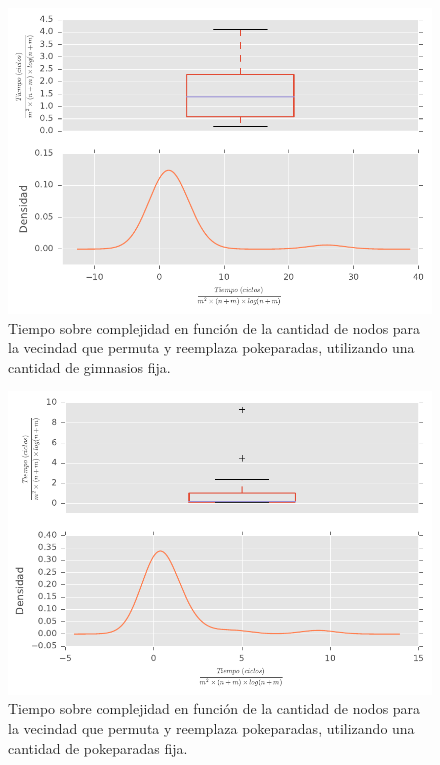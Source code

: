 \begin{figure}[H]
  \begin{center}
    \includegraphics{../experimentacion/ej3/expFijo_complejidad_permutaYReemplazaPokeparadas_cantGimFija.pdf}
    \caption{Tiempo sobre complejidad en funci\'on de la cantidad de nodos para la vecindad que permuta y reemplaza pokeparadas, utilizando una cantidad de gimnasios fija.}
    \label{fig:ej3_expFijo_complejidad_permutaYReemplazaPokeparadas_cantGimFija}
  \end{center}
\end{figure}

\begin{figure}[H]
  \begin{center}
    \includegraphics{../experimentacion/ej3/expFijo_complejidad_permutaYReemplazaPokeparadas_cantPokFija.pdf}
    \caption{Tiempo sobre complejidad en funci\'on de la cantidad de nodos para la vecindad que permuta y reemplaza pokeparadas, utilizando una cantidad de pokeparadas fija.}
    \label{fig:ej3_expFijo_complejidad_permutaYReemplazaPokeparadas_cantPokFija}
  \end{center}
\end{figure}


